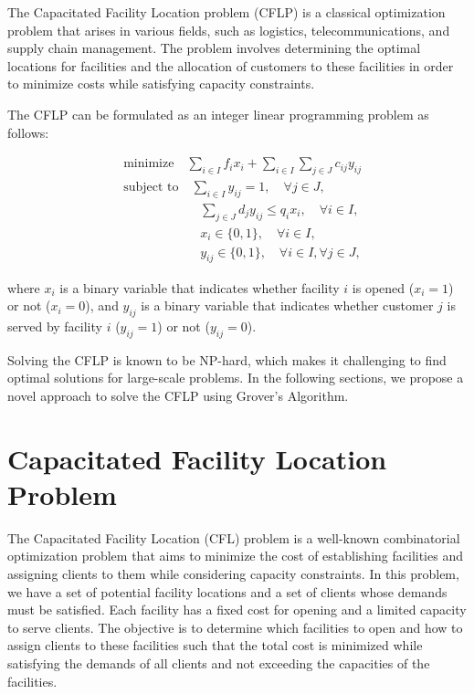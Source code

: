 The Capacitated Facility Location problem (CFLP) is a classical optimization problem that arises in various fields, such as logistics, telecommunications, and supply chain management. The problem involves determining the optimal locations for facilities and the allocation of customers to these facilities in order to minimize costs while satisfying capacity constraints.

The CFLP can be formulated as an integer linear programming problem as follows:

\begin{align}
    & \text{minimize} \quad \sum_{i \in I} f_i x_i + \sum_{i \in I} \sum_{j \in J} c_{ij} y_{ij} \label{eq:objective} \\
    & \text{subject to} \quad \sum_{i \in I} y_{ij} = 1, \quad \forall j \in J, \label{eq:customer_demand} \\
    & \qquad \qquad \qquad \sum_{j \in J} d_j y_{ij} \leq q_i x_i, \quad \forall i \in I, \label{eq:capacity_constraint} \\
    & \qquad \qquad \qquad x_i \in \{0, 1\}, \quad \forall i \in I, \\
    & \qquad \qquad \qquad y_{ij} \in \{0, 1\}, \quad \forall i \in I, \forall j \in J,
\end{align}

where $x_i$ is a binary variable that indicates whether facility $i$ is opened ($x_i = 1$) or not ($x_i = 0$), and $y_{ij}$ is a binary variable that indicates whether customer $j$ is served by facility $i$ ($y_{ij} = 1$) or not ($y_{ij} = 0$).

Solving the CFLP is known to be NP-hard, which makes it challenging to find optimal solutions for large-scale problems. In the following sections, we propose a novel approach to solve the CFLP using Grover's Algorithm.

\section{Capacitated Facility Location Problem}
The Capacitated Facility Location (CFL) problem is a well-known combinatorial optimization problem that aims to minimize the cost of establishing facilities and assigning clients to them while considering capacity constraints. In this problem, we have a set of potential facility locations and a set of clients whose demands must be satisfied. Each facility has a fixed cost for opening and a limited capacity to serve clients. The objective is to determine which facilities to open and how to assign clients to these facilities such that the total cost is minimized while satisfying the demands of all clients and not exceeding the capacities of the facilities.


